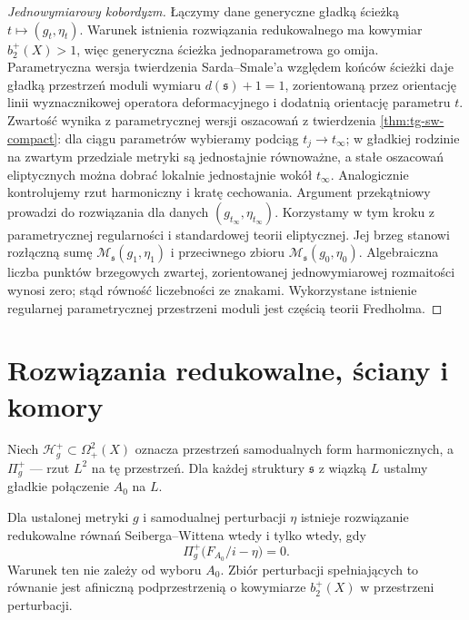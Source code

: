 \begin{proof}[Jednowymiarowy kobordyzm]
Łączymy dane generyczne gładką ścieżką
$t\mapsto(g_t,\eta_t)$. Warunek istnienia rozwiązania
redukowalnego ma kowymiar $b_2^+(X)>1$,
więc generyczna ścieżka jednoparametrowa go omija.
Parametryczna wersja twierdzenia Sarda--Smale'a
względem końców ścieżki daje gładką przestrzeń
moduli wymiaru $d(\mathfrak s)+1=1$,
zorientowaną przez orientację linii wyznacznikowej
operatora deformacyjnego i dodatnią orientację
parametru $t$. Zwartość wynika z parametrycznej
wersji oszacowań z twierdzenia \ref{thm:tg-sw-compact}:
dla ciągu parametrów wybieramy podciąg
$t_j\to t_\infty$; w gładkiej rodzinie na
zwartym przedziale metryki są jednostajnie
równoważne, a stałe oszacowań eliptycznych
można dobrać lokalnie jednostajnie wokół
$t_\infty$. Analogicznie kontrolujemy rzut
harmoniczny i kratę cechowania. Argument
przekątniowy prowadzi do rozwiązania dla
danych $(g_{t_\infty},\eta_{t_\infty})$.
Korzystamy w tym kroku z parametrycznej
regularności i standardowej teorii eliptycznej.
Jej brzeg stanowi rozłączną sumę
$\mathcal M_{\mathfrak s}(g_1,\eta_1)$ i przeciwnego
zbioru $\mathcal M_{\mathfrak s}(g_0,\eta_0)$.
Algebraiczna liczba punktów brzegowych zwartej,
zorientowanej jednowymiarowej rozmaitości wynosi zero;
stąd równość liczebności ze znakami.
Wykorzystane istnienie regularnej parametrycznej
przestrzeni moduli jest częścią teorii Fredholma.
\end{proof}

\section{Rozwiązania redukowalne, ściany i komory}
\label{sec:tg-sw-chambers}

Niech $\mathcal H_g^+\subset\Omega^2_+(X)$ oznacza
przestrzeń samodualnych form harmonicznych, a
$\Pi_g^+$ --- rzut $L^2$ na tę przestrzeń.
Dla każdej struktury $\mathfrak s$ z wiązką $L$
ustalmy gładkie połączenie $A_0$ na $L$.

\begin{stwierdzenie}
\label{prop:tg-sw-wall}
Dla ustalonej metryki $g$ i samodualnej perturbacji
$\eta$ istnieje rozwiązanie redukowalne równań
Seiberga--Wittena wtedy i tylko wtedy, gdy
\[
\Pi_g^+\bigl(F_{A_0}/i-\eta\bigr)=0.
\]
Warunek ten nie zależy od wyboru $A_0$. Zbiór perturbacji
spełniających to równanie jest afiniczną podprzestrzenią
o kowymiarze $b_2^+(X)$ w przestrzeni perturbacji.
\end{stwierdzenie}

